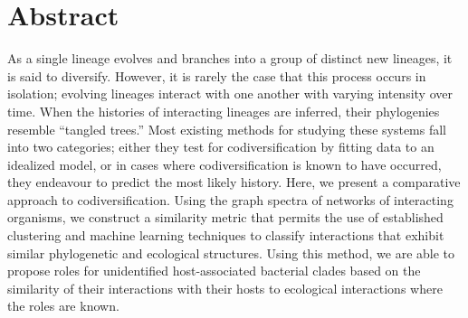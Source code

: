 \section{Abstract}

As a single lineage evolves and branches into a group of distinct new lineages, it is said to diversify. However, it is rarely the case that this process occurs in isolation; evolving lineages interact with one another with varying intensity over time. When the histories of interacting lineages are inferred, their phylogenies resemble ``tangled trees.'' Most existing methods for studying these systems fall into two categories; either they test for codiversification by fitting data to an idealized model, or in cases where codiversification is known to have occurred, they endeavour to predict the most likely history. Here, we present a comparative approach to codiversification. Using the graph spectra of networks of interacting organisms, we construct a similarity metric that permits the use of established clustering and machine learning techniques to classify interactions that exhibit similar phylogenetic and ecological structures. Using this method, we are able to propose roles for unidentified host-associated bacterial clades based on the similarity of their interactions with their hosts to ecological interactions where the roles are known.